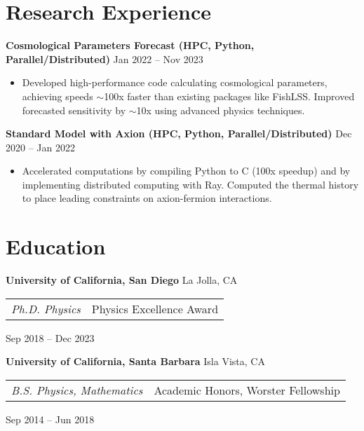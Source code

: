 \documentclass[letterpaper,12pt]{article}
\newenvironment{zitemize}{
\begin{itemize} \vspace{-.8em}\itemsep 0pt \parskip 0pt}
{\end{itemize}\vspace{-.7em}}
\begin{document}
\section{Research Experience}

\textbf{Cosmological Parameters Forecast (HPC, Python, Parallel/Distributed)} \hfill Jan 2022 -- Nov 2023 \\
\begin{zitemize}
    \item Developed high-performance code calculating cosmological parameters, achieving speeds $\sim$100x faster than existing packages like FishLSS. Improved forecasted sensitivity by $\sim$10x using advanced physics techniques.
\end{zitemize}

\textbf{Standard Model with Axion (HPC, Python, Parallel/Distributed)} \hfill Dec 2020 -- Jan 2022 \\
\begin{zitemize}
    \item Accelerated computations by compiling Python to C (100x speedup) and by implementing distributed computing with Ray. Computed the thermal history to place leading constraints on axion-fermion interactions.
\end{zitemize}



\section{Education}

\textbf{University of California, San Diego} \hfill La Jolla, CA \\
\begin{tabular}{p{12em} p{20em}}
    \textit{Ph.D. Physics} 
    & Physics Excellence Award 
\end{tabular}
\hfill Sep 2018 -- Dec 2023

\textbf{University of California, Santa Barbara} \hfill Isla Vista, CA \\
\begin{tabular}{p{12em} p{20em}}
    \textit{B.S. Physics, Mathematics}
    & Academic Honors, Worster Fellowship
\end{tabular}
\hfill Sep 2014 -- Jun 2018
\end{document}
